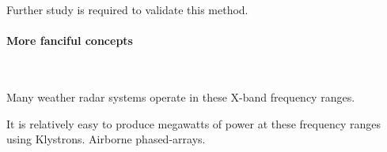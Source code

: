 \documentclass[fleqn,10pt]{article}
\begin{document}
\begin{multicols}{1}
Further study is required to validate this method.

\paragraph{\textbf{More fanciful concepts}}\

Many weather radar systems operate in these X-band frequency ranges. 

It is relatively easy to produce megawatts of power at these frequency ranges using Klystrons. Airborne phased-arrays.



\end{multicols}
\end{document}
